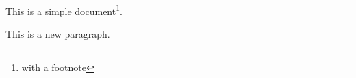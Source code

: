 \documentclass[a4paper, 12pt]{article} %
\begin{document}
	This is a simple
	document\footnote{with a footnote}.
	
	This is a new paragraph.
\end{document}
